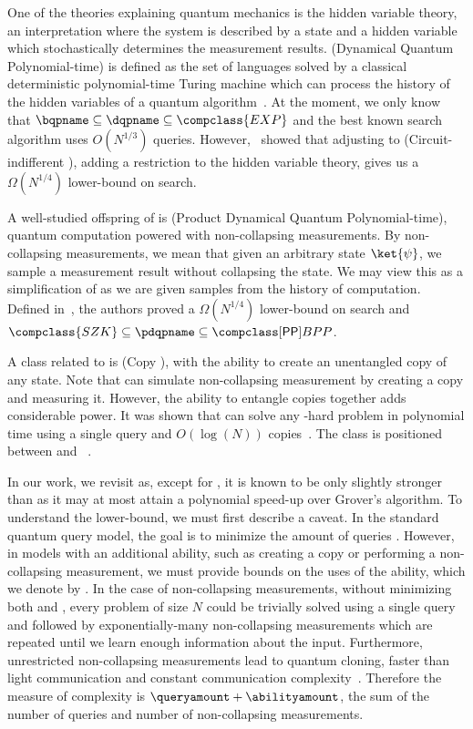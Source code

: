 One of the theories explaining quantum mechanics is the hidden variable theory, an interpretation where the system is described by a state and a hidden variable which stochastically determines the measurement results. \dqpname (Dynamical Quantum Polynomial-time) is defined as the set of languages solved by a classical deterministic polynomial-time Turing machine which can process the history of the hidden variables of a quantum algorithm~\cite{dqp}. At the moment, we only know that $\bqpname\subseteq\dqpname\subseteq\compclass{EXP}$ and the best known search algorithm uses $O(N^{1/3})$ queries. However,~\cite{space_above_bqp} showed that adjusting \dqpname to (Circuit-indifferent \dqpname), adding a restriction to the hidden variable theory, gives us a $\Omega(N^{1/4})$ lower-bound on search.

A well-studied offspring of \dqpname is \pdqpname (Product Dynamical Quantum Polynomial-time), quantum computation powered with non-collapsing measurements. By non-collapsing measurements, we mean that given an arbitrary state $\ket{\psi}$, we sample a measurement result without collapsing the state.
We may view this as a simplification of \dqpname as we are given samples from the history of computation. Defined in~\cite{space_above_bqp}, the authors proved a $\Omega(N^{1/4})$ lower-bound on search and $\compclass{SZK}\subseteq\pdqpname\subseteq\compclass[\mathsf{PP}]{BPP}$.

A class related to \pdqpname is \copybqpname (Copy \bqpname), \bqpname with the ability to create an unentangled copy of any state. Note that \copybqpname can simulate non-collapsing measurement by creating a copy and measuring it. However, the ability to entangle copies together adds considerable power. It was shown that \copybqpname can solve any -hard problem in polynomial time using a single query and $O(\log (N))$ copies~\cite{grover_search_no_signaling_principle}. The class is positioned between   and ~\cite{rewindable_bqp}.

In our work, we revisit \pdqpname as, except for , it is known to be only slightly stronger than \bqpname as it may at most attain a polynomial speed-up over Grover's algorithm. To understand the lower-bound, we must first describe a caveat. In the standard quantum query model, the goal is to minimize the amount of queries \queryamount. However, in models with an additional ability, such as creating a copy or performing a non-collapsing measurement, we must provide bounds on the uses of the ability, which we denote by \abilityamount. In the case of non-collapsing measurements, without minimizing both \queryamount and \abilityamount, every problem of size $N$ could be trivially solved using a single query and followed by exponentially-many non-collapsing measurements which are repeated until we learn enough information about the input. Furthermore, unrestricted non-collapsing measurements lead to quantum cloning, faster than light communication and constant communication complexity~\cite{space_above_bqp}. Therefore the measure of complexity is $\queryamount + \abilityamount$, the sum of the number of queries and number of non-collapsing measurements.

